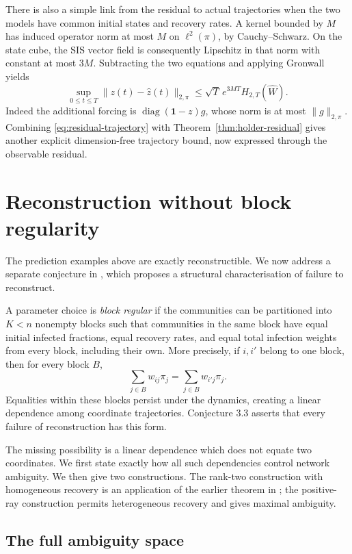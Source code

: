 There is also a simple link from the residual to actual trajectories when the two models have common initial states and recovery rates. A kernel bounded by $M$ has induced operator norm at most $M$ on $\ell^2(\pi)$, by Cauchy--Schwarz. On the state cube, the SIS vector field is consequently Lipschitz in that norm with constant at most $3M$. Subtracting the two equations and applying Gronwall yields
\begin{equation}
 \sup_{0\leq t\leq T}\|z(t)-\widehat z(t)\|_{2,\pi}
 \leq\sqrt T\,e^{3MT}H_{2,T}(\widehat W).
 \label{eq:residual-trajectory}
\end{equation}
Indeed the additional forcing is $\operatorname{diag}(\mathbf1-z)g$, whose norm is at most $\|g\|_{2,\pi}$. Combining \eqref{eq:residual-trajectory} with Theorem~\ref{thm:holder-residual} gives another explicit dimension-free trajectory bound, now expressed through the observable residual.

\section{Reconstruction without block regularity}
\label{sec:reconstruction}

The prediction examples above are exactly reconstructible. We now address a separate conjecture in \cite{KH2026}, which proposes a structural characterisation of failure to reconstruct.

A parameter choice is \emph{block regular} if the communities can be partitioned into $K<n$ nonempty blocks such that communities in the same block have equal initial infected fractions, equal recovery rates, and equal total infection weights from every block, including their own. More precisely, if $i,i'$ belong to one block, then for every block $B$,
\[
 \sum_{j\in B}w_{ij}\pi_j=\sum_{j\in B}w_{i'j}\pi_j.
\]
Equalities within these blocks persist under the dynamics, creating a linear dependence among coordinate trajectories. Conjecture 3.3 asserts that every failure of reconstruction has this form.

The missing possibility is a linear dependence which does not equate two coordinates. We first state exactly how all such dependencies control network ambiguity. We then give two constructions. The rank-two construction with homogeneous recovery is an application of the earlier theorem in \cite{PDM2021}; the positive-ray construction permits heterogeneous recovery and gives maximal ambiguity.

\subsection{The full ambiguity space}

